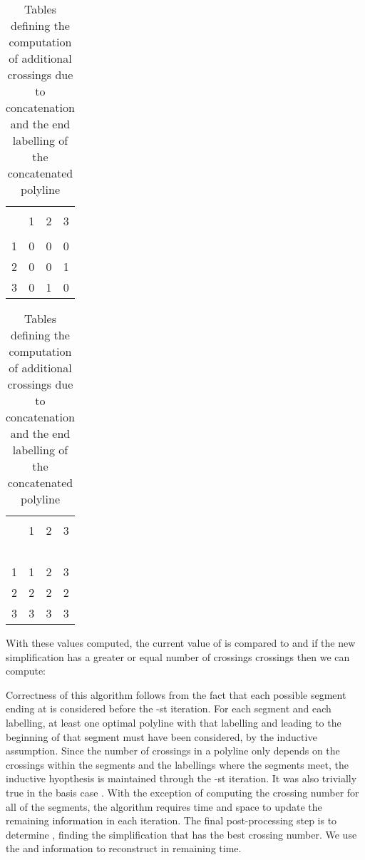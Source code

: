 \documentclass{article}
\begin{document}
 \begin{table}[ht]
	\begin{minipage}[b]{0.45\linewidth}\centering
	\begin{tabular}{|c|ccc|}
	\hline  \multirow{2}{*}{} & \multicolumn{3}{|c|}{} \\
	   & 1 & 2 & 3  \\  
	\hline
	 & & &  \\
	1 & 0 & 0 & 0  \\
	2  & 0 & 0 & 1  \\
	3  & 0 & 1 & 0  \\
	\hline
	\end{tabular}
	\end{minipage}
	\begin{minipage}[b]{0.45\linewidth}
	\centering
	\begin{tabular}{|c|ccc|}
	\hline  \multirow{2}{*}{} & \multicolumn{3}{|c|}{} \\
	   & 1 & 2 & 3  \\  
	\hline
	 & & & \ \\
	1  & 1 & 2 & 3  \\
	2  & 2 & 2 & 2  \\
	3  & 3 & 3 & 3  \\
	\hline
	\end{tabular}
	\end{minipage}
	\caption{Tables defining the computation of additional crossings  due to concatenation and the end labelling of the concatenated polyline }
	\label{tab:etapsi}
	\end{table}
 
With these values computed, the current value of
 is compared to
 and if the new simplification has a
greater or equal number of crossings crossings then we can compute:
 


Correctness of this algorithm follows from the fact that each possible
segment ending at  is considered before the -st iteration.  For
each segment and each labelling, at least one optimal polyline with that
labelling and leading to
the beginning of that segment must have been considered, by the inductive
assumption.  Since the number of crossings in a polyline
only depends on the crossings
within the segments and the labellings where the segments meet,
the inductive hyopthesis is maintained through the -st iteration.
It was also trivially true in the basis case .
With the exception of computing the crossing number for all of the segments,
the algorithm requires  time and space to update the remaining
information in each iteration.  The final post-processing step is to determine
,
finding the simplification that has the best crossing number.
We use the  and  information to reconstruct
 in  remaining time.
\end{document}
